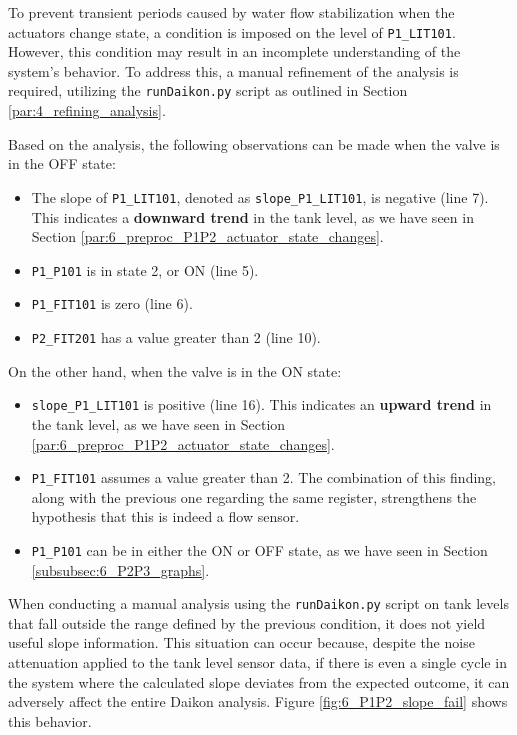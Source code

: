 To prevent transient periods caused by water flow stabilization when the actuators change state, a condition is imposed on the level of \texttt{P1\_LIT101}. However, this condition may result in an incomplete understanding of the system's behavior. To address this, a manual refinement of the analysis is required, utilizing the \texttt{runDaikon.py} script as outlined in Section \ref{par:4_refining_analysis}.

\bigskip
Based on the analysis, the following observations can be made when the valve is in the OFF state:

\begin{itemize}
	\item The slope of \texttt{P1\_LIT101}, denoted as \texttt{slope\_P1\_LIT101}, is negative (line 7). This indicates a \textbf{downward trend} in the tank level, as we have seen in Section \ref{par:6_preproc_P1P2_actuator_state_changes}.
	\item \texttt{P1\_P101} is in state 2, or ON (line 5).
	\item \texttt{P1\_FIT101} is zero (line 6).
	\item \texttt{P2\_FIT201} has a value greater than 2 (line 10).
\end{itemize}

\noindent On the other hand, when the valve is in the ON state:

\begin{itemize}
	\item \texttt{slope\_P1\_LIT101} is positive (line 16). This indicates an \textbf{upward trend} in the tank level, as we have seen in Section \ref{par:6_preproc_P1P2_actuator_state_changes}.
	\item \texttt{P1\_FIT101} assumes a value greater than 2. The combination of this finding, along with the previous one regarding the same register, strengthens the hypothesis that this is indeed a flow sensor.
	\item \texttt{P1\_P101} can be in either the ON or OFF state, as we have seen in Section \ref{subsubsec:6_P2P3_graphs}.
\end{itemize}

When conducting a manual analysis using the \texttt{runDaikon.py} script on tank levels that fall outside the range defined by the previous condition, it does not yield useful slope information. This situation can occur because, despite the noise attenuation applied to the tank level sensor data, if there is even a single cycle in the system where the calculated slope deviates from the expected outcome, it can adversely affect the entire Daikon analysis. Figure \ref{fig:6_P1P2_slope_fail} shows this behavior.

